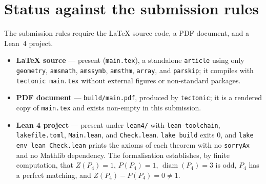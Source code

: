\documentclass[11pt]{article}
\theoremstyle{definition}
\theoremstyle{remark}
\newcommand{\diam}{\operatorname{diam}}
\begin{document}
\section{Status against the submission rules}

The submission rules require the LaTeX source code, a PDF document, and a Lean~4
project.

\begin{itemize}
\item \textbf{LaTeX source} --- present (\texttt{main.tex}), a standalone
  \texttt{article} using only \texttt{geometry}, \texttt{amsmath},
  \texttt{amssymb}, \texttt{amsthm}, \texttt{array}, and \texttt{parskip};
  it compiles with \texttt{tectonic main.tex} without external figures or
  non-standard packages.
\item \textbf{PDF document} --- \texttt{build/main.pdf}, produced by
  \texttt{tectonic}; it is a rendered copy of \texttt{main.tex} and exists
  non-empty in this submission.
\item \textbf{Lean 4 project} --- present under \texttt{lean4/} with
  \texttt{lean-toolchain}, \texttt{lakefile.toml}, \texttt{Main.lean}, and
  \texttt{Check.lean}. \texttt{lake build} exits $0$, and \texttt{lake env lean
  Check.lean} prints the axioms of each theorem with no \texttt{sorryAx} and no
  Mathlib dependency. The formalisation establishes, by finite computation, that
  $Z(P_4)=1$, $P(P_4)=1$, $\diam(P_4)=3$ is odd, $P_4$ has a perfect matching,
  and $Z(P_4)-P(P_4)=0\neq 1$.
\end{itemize}
\end{document}
